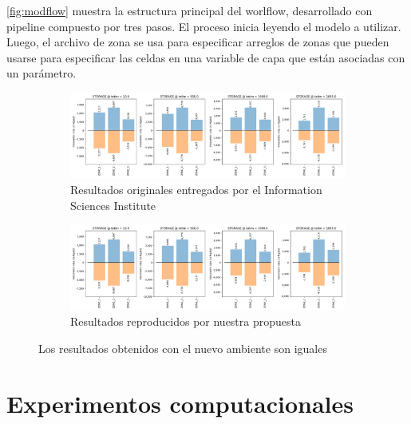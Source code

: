\ref{fig:modflow} muestra la estructura principal del worlflow, desarrollado con pipeline compuesto por tres pasos. El proceso inicia leyendo el modelo a utilizar. Luego, el archivo de zona se usa para especificar arreglos de zonas que pueden usarse para especificar las celdas en una variable de capa que están asociadas con un parámetro.

\begin{figure}[]
    \centering
    \begin{subfigure}[b]{\textwidth}
         \centering
         \includegraphics[width=\textwidth]{Figures/viz-original}
         \caption{Resultados originales entregados por el Information Sciences Institute}
         \label{fig:modflow-}
     \end{subfigure}
	
	    \begin{subfigure}[b]{\textwidth}
         \centering
         \includegraphics[width=\textwidth]{Figures/viz-original}
         \caption{Resultados reproducidos por nuestra propuesta}
         \label{fig:pegasus48}
     \end{subfigure}
        \caption{Los resultados obtenidos con el nuevo ambiente son iguales}
        \label{fig:dependencies-graph}
\end{figure}




\section{Experimentos computacionales}








